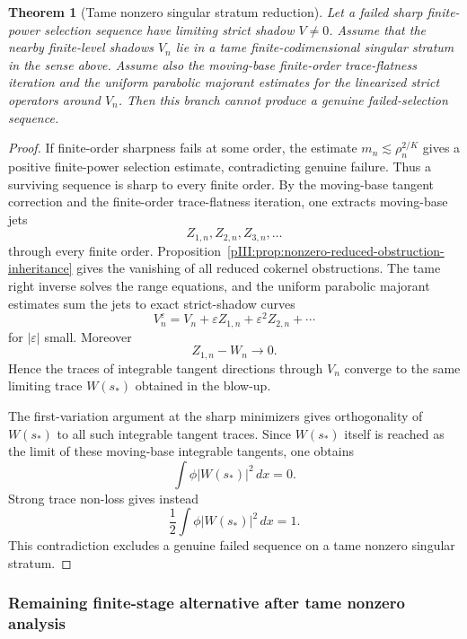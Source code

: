 \documentclass[11pt]{article}
\numberwithin{equation}{section}
\theoremstyle{plain}
\newtheorem{theorem}{Theorem}[section]
\theoremstyle{definition}
\theoremstyle{remark}
\begin{document}
\begin{theorem}[Tame nonzero singular stratum reduction]
\label{pIII:thm:tame-nonzero-singular-closure}
Let a failed sharp finite-power selection sequence have limiting strict shadow \(V\neq0\).  Assume
that the nearby finite-level shadows \(V_n\) lie in a tame finite-codimensional singular stratum in the
sense above.  Assume also the moving-base finite-order trace-flatness iteration and the uniform
parabolic majorant estimates for the linearized strict operators around \(V_n\).  Then this branch
cannot produce a genuine failed-selection sequence.
\end{theorem}

\begin{proof}
If finite-order sharpness fails at some order, the estimate
\(m_n\lesssim\rho_n^{2/K}\) gives a positive finite-power selection estimate, contradicting genuine
failure.  Thus a surviving sequence is sharp to every finite order.  By the moving-base tangent
correction and the finite-order trace-flatness iteration, one extracts moving-base jets
\[
        Z_{1,n},Z_{2,n},Z_{3,n},\ldots
\]
through every finite order.  Proposition~\ref{pIII:prop:nonzero-reduced-obstruction-inheritance} gives the
vanishing of all reduced cokernel obstructions.  The tame right inverse solves the range equations,
and the uniform parabolic majorant estimates sum the jets to exact strict-shadow curves
\[
        V_n^\varepsilon=V_n+\varepsilon Z_{1,n}+\varepsilon^2Z_{2,n}+\cdots
\]
for \(|\varepsilon|\) small.  Moreover
\[
        Z_{1,n}-W_n\to0.
\]
Hence the traces of integrable tangent directions through \(V_n\) converge to the same limiting trace
\(W(s_*)\) obtained in the blow-up.

The first-variation argument at the sharp minimizers gives orthogonality of \(W(s_*)\) to all such
integrable tangent traces.  Since \(W(s_*)\) itself is reached as the limit of these moving-base
integrable tangents, one obtains
\[
        \int \phi |W(s_*)|^2\,dx=0.
\]
Strong trace non-loss gives instead
\[
        \frac12\int \phi |W(s_*)|^2\,dx=1.
\]
This contradiction excludes a genuine failed sequence on a tame nonzero singular stratum.
\end{proof}

\subsubsection{Remaining finite-stage alternative after tame nonzero analysis}
\end{document}
